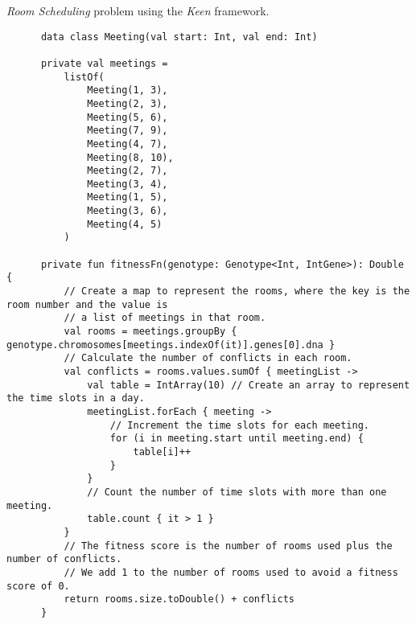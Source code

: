     \begin{listing}[H]
      \caption{\textit{Room Scheduling} problem using the \textit{Keen} framework.}
      \label{lst:app:keen_room_scheduling}
    \end{listing}
    \begin{verbatim}
      data class Meeting(val start: Int, val end: Int)

      private val meetings =
          listOf(
              Meeting(1, 3),
              Meeting(2, 3),
              Meeting(5, 6),
              Meeting(7, 9),
              Meeting(4, 7),
              Meeting(8, 10),
              Meeting(2, 7),
              Meeting(3, 4),
              Meeting(1, 5),
              Meeting(3, 6),
              Meeting(4, 5)
          )

      private fun fitnessFn(genotype: Genotype<Int, IntGene>): Double {
          // Create a map to represent the rooms, where the key is the room number and the value is
          // a list of meetings in that room.
          val rooms = meetings.groupBy { genotype.chromosomes[meetings.indexOf(it)].genes[0].dna }
          // Calculate the number of conflicts in each room.
          val conflicts = rooms.values.sumOf { meetingList ->
              val table = IntArray(10) // Create an array to represent the time slots in a day.
              meetingList.forEach { meeting ->
                  // Increment the time slots for each meeting.
                  for (i in meeting.start until meeting.end) {
                      table[i]++
                  }
              }
              // Count the number of time slots with more than one meeting.
              table.count { it > 1 }
          }
          // The fitness score is the number of rooms used plus the number of conflicts.
          // We add 1 to the number of rooms used to avoid a fitness score of 0.
          return rooms.size.toDouble() + conflicts
      }


\end{verbatim}
